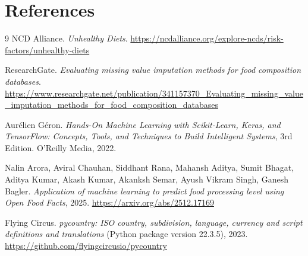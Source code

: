 \documentclass[11pt,a4paper]{article}
\begin{document}
\section{References}
\begin{thebibliography}{9}
NCD Alliance. \textit{Unhealthy Diets}. \url{https://ncdalliance.org/explore-ncds/risk-factors/unhealthy-diets}


ResearchGate. \textit{Evaluating missing value imputation methods for food composition databases}. \url{https://www.researchgate.net/publication/341157370_Evaluating_missing_value_imputation_methods_for_food_composition_databases}

Aurélien Géron. \textit{Hands-On Machine Learning with Scikit-Learn, Keras, and TensorFlow: Concepts, Tools, and Techniques to Build Intelligent Systems}, 3rd Edition. O'Reilly Media, 2022.

Nalin Arora, Aviral Chauhan, Siddhant Rana, Mahansh Aditya, Sumit Bhagat, Aditya Kumar, Akash Kumar, Akanksh Semar, Ayush Vikram Singh, Ganesh Bagler. \textit{Application of machine learning to predict food processing level using Open Food Facts}, 2025. \url{https://arxiv.org/abs/2512.17169}

Flying Circus. \textit{pycountry: ISO country, subdivision, language, currency and script definitions and translations} (Python package version 22.3.5), 2023. \url{https://github.com/flyingcircusio/pycountry}

\end{thebibliography}
\end{document}
